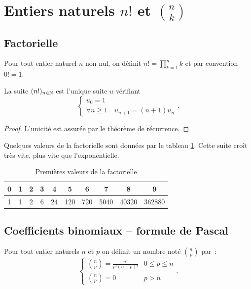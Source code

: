 \section{Entiers naturels \(n!\) et \(\binom{n}{k}\)}

\subsection{Factorielle}

\begin{defdef}
  Pour tout entier naturel \(n\) non nul, on définit \(n!=\prod_{k = 1}^n k\) et 
  par convention \(0!=1\).
\end{defdef}

\begin{prop}
  La suite \((n!)_{n\in\mathbb{N}}\) est l'unique suite \(u\) vérifiant
  \begin{equation}
    \begin{cases}
      u_0 = 1 \\
      \forall n\geqslant 1 \quad u_{n + 1}=(n + 1) u_n
    \end{cases}.
  \end{equation}
\end{prop}
\begin{proof}
  L'unicité est assurée par le théorème de récurrence.
\end{proof}
Quelques valeurs de la factorielle sont données par le tableau 
\ref{tab:factorielle}. Cette suite croît très vite, plus vite que 
l'exponentielle.

\begin{table}[h]
  \centering
  \begin{tabular}{|c|c|c|c|c|c|c|c|c|c|}
    \hline
    0 & 1 & 2 & 3 & 4  & 5   & 6   & 7    & 8     & 9 \\ \hline
    1 & 1 & 2 & 6 & 24 & 120 & 720 & 5040 & 40320 & 362880 \\ \hline
  \end{tabular}
  \caption{Premières valeurs de la factorielle}
  \label{tab:factorielle}
\end{table}

\subsection{Coefficients binomiaux -- formule de Pascal}

\begin{defdef}
  Pour tout entier naturels \(n\) et \(p\) on définit un nombre noté 
  \(\binom{n}{p}\) par~:
  \begin{equation}
    \begin{cases}
      \binom{n}{p} = \frac{n!}{p!(n - p)!} & 0\leqslant p \leqslant n \\
      \binom{n}{p} = 0 & p > n
    \end{cases}.
  \end{equation}
\end{defdef}

